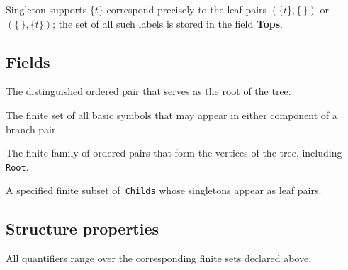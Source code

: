 \documentclass[11pt]{amsart}
\theoremstyle{remark}            %
\newcommand{\Fin}{\mathsf{Finset}}
\begin{document}
Singleton supports $\{t\}$ correspond precisely to the leaf pairs
$(\{t\},\{\,\})$ or $(\{\,\},\{t\})$; the set of all such labels is stored in
the field \textbf{Tops}.

 

\subsection{Fields}

\begin{description}[style=unboxed,leftmargin=0pt]

\item[\textbf{\texttt{Root} : $\Fin\alpha\times\Fin\alpha$}]  
  The distinguished ordered pair that serves as the root of the tree.

\item[\textbf{\texttt{Childs} : $\Fin\alpha$}]  
  The finite set of all basic symbols that may appear in either component of a branch pair.

\item[\textbf{\texttt{Branches} : $\Fin(\Fin\alpha\times\Fin\alpha)$}]  
  The finite family of  ordered pairs that form the vertices of the tree,
  including \texttt{Root}.

\item[\textbf{\texttt{Tops} : $\Fin\alpha$}]  
  A specified finite subset of~\texttt{Childs} whose singletons appear as leaf pairs.

\end{description}

\subsection{Structure properties}

All quantifiers range over the corresponding finite sets declared above.
\end{document}
